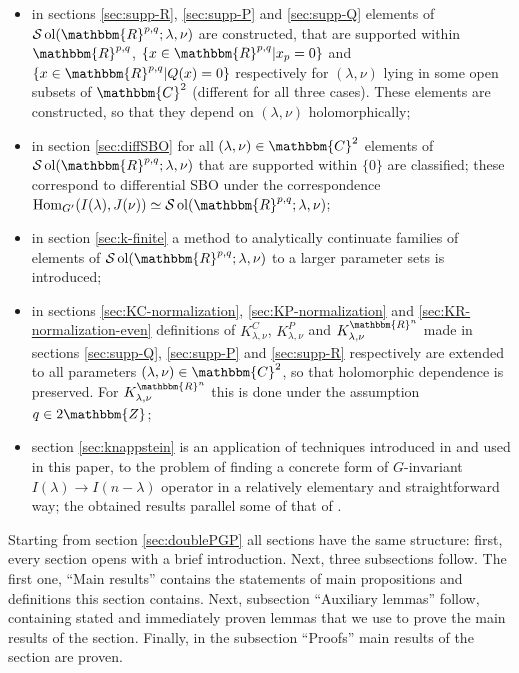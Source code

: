 \documentclass{article}
\newcommand{\tmop}[1]{\ensuremath{\operatorname{#1}}}
\newenvironment{itemizedot}{\begin{itemize} \renewcommand{\labelitemi}{$\bullet$}\renewcommand{\labelitemii}{$\bullet$}\renewcommand{\labelitemiii}{$\bullet$}\renewcommand{\labelitemiv}{$\bullet$}}{\end{itemize}}
\numberwithin{definition}{section}
\numberwithin{lemma}{section}
\numberwithin{proposition}{section}
{\theorembodyfont{\rmfamily}\newtheorem{remark}{Remark}
\numberwithin{remark}{section}
}
\begin{document}
\begin{itemizedot}
  \item in sections \ref{sec:supp-R}, \ref{sec:supp-P} and \ref{sec:supp-Q}
  elements of $\mathcal{S} \tmop{ol} ( \mathbbm{R}^{p, q} ; \lambda, \nu)$ are
  constructed, that are supported within $\mathbbm{R}^{p, q}$, $\{ x \in
  \mathbbm{R}^{p, q} | x_p = 0 \}$ and $\{ x \in \mathbbm{R}^{p, q} | Q ( x) =
  0 \}$ respectively for $( \lambda, \nu)$ lying in some open subsets of
  $\mathbbm{C}^2$ (different for all three cases). These elements are
  constructed, so that they depend on $( \lambda, \nu)$ holomorphically;
  
  \item in section \ref{sec:diffSBO} for all $( \lambda, \nu) \in
  \mathbbm{C}^2$ elements of $\mathcal{S} \tmop{ol} ( \mathbbm{R}^{p, q} ;
  \lambda, \nu)$ that are supported within $\{ 0 \}$ are classified; these
  correspond to differential SBO under the correspondence $\tmop{Hom}_{G'} ( I
  ( \lambda), J ( \nu)) \simeq \mathcal{S} \tmop{ol} ( \mathbbm{R}^{p, q} ;
  \lambda, \nu)$;
  
  \item in section \ref{sec:k-finite} a method to analytically continuate
  families of elements of $\mathcal{S} \tmop{ol} ( \mathbbm{R}^{p, q} ;
  \lambda, \nu)$ to a larger parameter sets is introduced;
  
  \item in sections \ref{sec:KC-normalization}, \ref{sec:KP-normalization} and
  \ref{sec:KR-normalization-even} definitions of $K_{\lambda, \nu}^C$,
  $K_{\lambda, \nu}^P$ and $K_{\lambda, \nu}^{\mathbbm{R}^n}$ made in sections
  \ref{sec:supp-Q}, \ref{sec:supp-P} and \ref{sec:supp-R} respectively are
  extended to all parameters $( \lambda, \nu) \in \mathbbm{C}^2$, so that
  holomorphic dependence is preserved. For $K_{\lambda, \nu}^{\mathbbm{R}^n}$
  this is done under the assumption $q \in 2\mathbbm{Z}$;
  
  \item section \ref{sec:knappstein} is an application of techniques
  introduced in {\cite{kobayashi2015symmetry}} and used in this paper, to the
  problem of finding a concrete form of $G$-invariant $I ( \lambda)
  \rightarrow I ( n - \lambda)$ operator in a relatively elementary and
  straightforward way; the obtained results parallel some of that of
  {\cite{KO1}}.
\end{itemizedot}
Starting from section \ref{sec:doublePGP} all sections have the same
structure: first, every section opens with a brief introduction. Next, three
subsections follow. The first one, ``Main results'' contains the statements of
main propositions and definitions this section contains. Next, subsection
``Auxiliary lemmas'' follow, containing stated and immediately proven lemmas
that we use to prove the main results of the section. Finally, in the
subsection ``Proofs'' main results of the section are proven.
\end{document}
